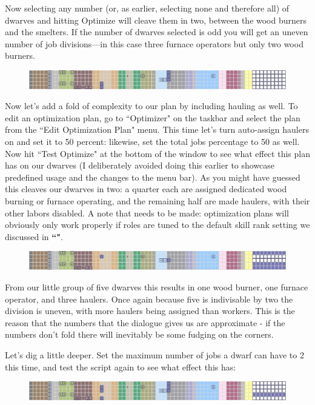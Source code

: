 \documentclass[]{article}
\begin{document}
Now selecting any number (or, as earlier, selecting none and therefore all) of dwarves and
hitting Optimize will cleave them in two, between the wood burners and the smelters. If the number of
dwarves selected is odd you will get an uneven number of job divisions---in this case three furnace
operators but only two wood burners.

\begin{figure}[h!]
\centering
\includegraphics[width=\linewidth]{Sec4Fig10}
\end{figure}

Now let's add a fold of complexity to our plan by including hauling as well. To edit an optimization
plan, go to ``Optimizer" on the taskbar and select the plan from the ``Edit Optimization Plan" menu. This
time let's turn auto-assign haulers on and set it to 50 percent: likewise, set the total jobs percentage
to 50 as well. Now hit ``Test Optimize" at the bottom of the window to see what effect this plan has on
our dwarves (I deliberately avoided doing this earlier to showcase predefined usage and the changes to
the menu bar). As you might have guessed this cleaves our dwarves in two: a quarter each are assigned
dedicated wood burning or furnace operating, and the remaining half are made haulers, with their other
labors disabled. A note that needs to be made: optimization plans will obviously only work properly if
roles are tuned to the default skill rank setting we discussed in \textbf{``"}.

\begin{figure}[h!] \centering \includegraphics[width=\linewidth]{Sec4Fig11}
\end{figure}

From our little group of five dwarves this results in one wood burner, one furnace operator, and three
haulers. Once again because five is indivisable by two the division is uneven, with more haulers being
assigned than workers.  This is the reason that the numbers that the dialogue gives us are approximate -
if the numbers don't fold there will inevitably be some fudging on the corners.

Let's dig a little deeper. Set the maximum number of jobs a dwarf can have to 2 this time, and test the
script again to see what effect this has:
\begin{figure}[h!] \centering \includegraphics[width=\linewidth]{Sec4Fig12}
\end{figure}
\end{document}
